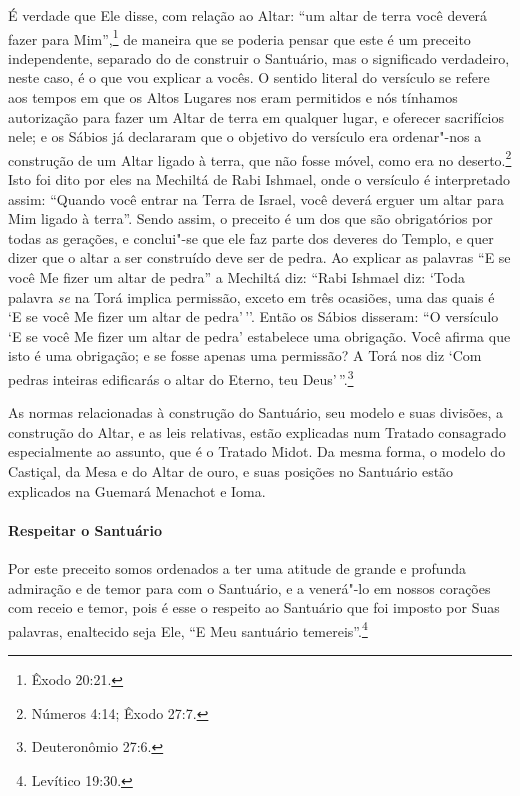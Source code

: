 \begin{multicols}{2}
É verdade que Ele disse, com relação ao Altar: ``um altar de terra você
deverá fazer para Mim'',\footnote{Êxodo 20:21.} de maneira que se poderia pensar
que este é um preceito independente, separado do de construir o
Santuário, mas o significado verdadeiro, neste caso, é o que vou
explicar a vocês. O sentido literal do versículo se refere aos tempos
em que os Altos Lugares nos eram permitidos e nós tínhamos autorização
para fazer um Altar de terra em qualquer lugar, e oferecer sacrifícios
nele; e os Sábios já declararam que o objetivo do versículo era
ordenar"-nos a construção de um Altar ligado à terra, que não fosse
móvel, como era no deserto.\footnote{Números 4:14; Êxodo 27:7.} Isto foi dito por eles
na Mechiltá\starr{} de Rabi Ishmael\starr, onde o versículo é interpretado assim:
``Quando você entrar na Terra de Israel, você deverá erguer um altar
para Mim ligado à terra''. Sendo assim, o preceito é um dos que são
obrigatórios por todas as gerações, e conclui"-se que ele faz parte dos
deveres do Templo, e quer dizer que o altar a ser construído deve ser
de pedra. Ao explicar as palavras ``E se você Me fizer um altar de
pedra'' a Mechiltá\starr{} diz: ``Rabi Ishmael\starr{} diz: `Toda palavra \emph{se} na
Torá\starr{} implica permissão, exceto em três ocasiões, uma das quais é `E se
você Me fizer um altar de pedra'\,''. Então os Sábios disseram: ``O
versículo `E se você Me fizer um altar de pedra' estabelece uma
obrigação. Você afirma que isto é uma obrigação; e se fosse apenas uma
permissão? A Torá\starr{} nos diz `Com pedras inteiras edificarás o altar do
Eterno, teu Deus'\,''.\footnote{Deuteronômio 27:6.}

As normas relacionadas à construção do Santuário, seu modelo e suas
divisões, a construção do Altar, e as leis relativas, estão explicadas
num Tratado consagrado especialmente ao assunto, que é o Tratado Midot\starr.
Da mesma forma, o modelo do Castiçal, da Mesa e do Altar de ouro, e suas
posições no Santuário estão explicados na Guemará\starr{} Menachot\starr{} e Ioma\starr.

\paragraph{Respeitar o Santuário}

Por este preceito somos ordenados a ter uma atitude de grande e profunda
admiração e de temor para com o Santuário, e a venerá"-lo em nossos
corações com receio e temor, pois é esse o respeito ao Santuário que foi
imposto por Suas palavras, enaltecido seja Ele, ``E Meu santuário
temereis''.\footnote{Levítico 19:30.}


\end{multicols}
